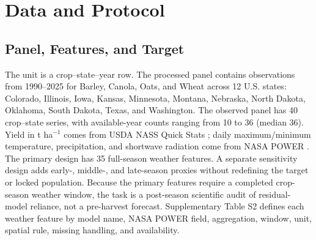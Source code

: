 \documentclass[conference]{IEEEtran}
\begin{document}
\section{Data and Protocol}
\subsection{Panel, Features, and Target}
The unit is a crop--state--year row. The processed panel contains \AuditTotalRows{}
observations from 1990--2025 for Barley, Canola, Oats, and Wheat across 12 U.S.
states: Colorado, Illinois, Iowa, Kansas, Minnesota, Montana, Nebraska, North
Dakota, Oklahoma, South Dakota, Texas, and Washington. The observed panel has 40
crop--state series, with available-year counts ranging from 10 to 36 (median 36).
Yield in t ha$^{-1}$ comes from USDA NASS Quick Stats
\cite{USDANASSQuickStats}; daily maximum/minimum temperature, precipitation, and
shortwave radiation come from NASA POWER \cite{NASAPOWER2026}. The primary design
has 35 full-season weather features. A separate sensitivity design adds early-,
middle-, and late-season proxies without redefining the target or locked population.
Because the primary features require a completed crop-season weather window, the
task is a post-season scientific audit of residual-model reliance, not a
pre-harvest forecast. Supplementary Table S2 defines each weather feature by model
name, NASA POWER field, aggregation, window, unit, spatial rule, missing handling,
and availability.

\begin{table}[t]
\centering
\caption{Data-flow and final-test eligibility reconstructed from the raw inputs.}
\label{tab:dataflow}
\scriptsize
\resizebox{\columnwidth}{!}{}
\end{table}
\end{document}
